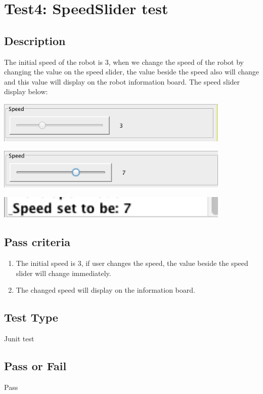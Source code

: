 \documentclass[11pt, a4paper]{report}
\begin{document}
\section{Test4: SpeedSlider test}
\subsection{Description}
The initial speed of the robot is 3, when we change the speed of the robot by changing the value on the speed slider, the value beside the speed also will change and this value will display on the robot information board. The speed slider display below:
  \begin{center}
 \includegraphics[width=11.20cm]{theinitialspeed}
\end{center}
 \begin{center}
 \includegraphics[width=11.20cm]{thechangedspeed}
\end{center}
 \begin{center}
 \includegraphics[width=11.20cm]{informationboard}
\end{center}
\subsection{Pass criteria}
\begin{enumerate}
\item The initial speed is 3, if user changes the speed, the value beside the speed slider will change immediately.
\item The changed speed will display on the information board. 
\end{enumerate}
\subsection{Test Type}
Junit test
\subsection{Pass or Fail}
Pass
\end{document}
